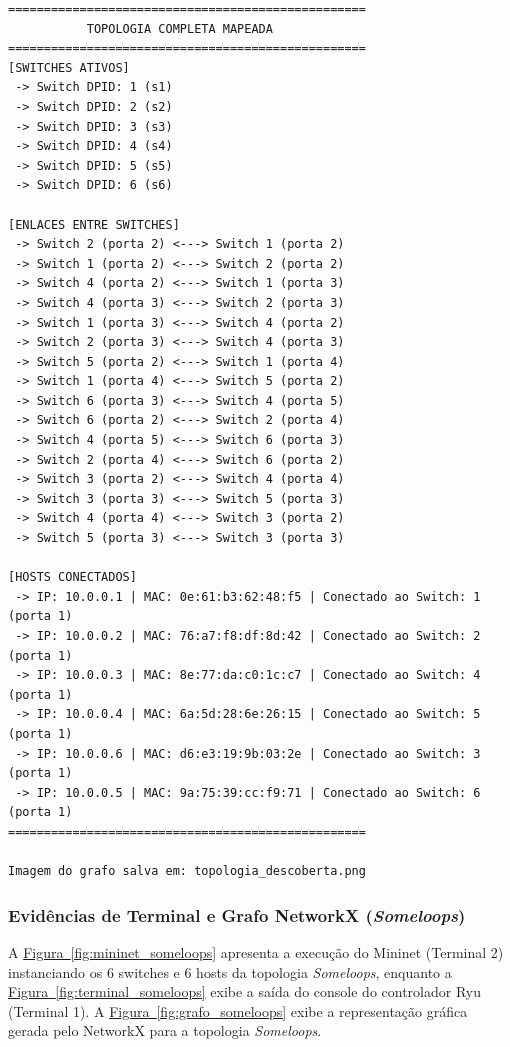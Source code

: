 \documentclass[12pt,a4paper]{article}
\begin{document}
\begin{lstlisting}[caption={Saida consolidada do controlador Ryu para a topologia Someloops}]
==================================================
           TOPOLOGIA COMPLETA MAPEADA            
==================================================
[SWITCHES ATIVOS]
 -> Switch DPID: 1 (s1)
 -> Switch DPID: 2 (s2)
 -> Switch DPID: 3 (s3)
 -> Switch DPID: 4 (s4)
 -> Switch DPID: 5 (s5)
 -> Switch DPID: 6 (s6)

[ENLACES ENTRE SWITCHES]
 -> Switch 2 (porta 2) <---> Switch 1 (porta 2)
 -> Switch 1 (porta 2) <---> Switch 2 (porta 2)
 -> Switch 4 (porta 2) <---> Switch 1 (porta 3)
 -> Switch 4 (porta 3) <---> Switch 2 (porta 3)
 -> Switch 1 (porta 3) <---> Switch 4 (porta 2)
 -> Switch 2 (porta 3) <---> Switch 4 (porta 3)
 -> Switch 5 (porta 2) <---> Switch 1 (porta 4)
 -> Switch 1 (porta 4) <---> Switch 5 (porta 2)
 -> Switch 6 (porta 3) <---> Switch 4 (porta 5)
 -> Switch 6 (porta 2) <---> Switch 2 (porta 4)
 -> Switch 4 (porta 5) <---> Switch 6 (porta 3)
 -> Switch 2 (porta 4) <---> Switch 6 (porta 2)
 -> Switch 3 (porta 2) <---> Switch 4 (porta 4)
 -> Switch 3 (porta 3) <---> Switch 5 (porta 3)
 -> Switch 4 (porta 4) <---> Switch 3 (porta 2)
 -> Switch 5 (porta 3) <---> Switch 3 (porta 3)

[HOSTS CONECTADOS]
 -> IP: 10.0.0.1 | MAC: 0e:61:b3:62:48:f5 | Conectado ao Switch: 1 (porta 1)
 -> IP: 10.0.0.2 | MAC: 76:a7:f8:df:8d:42 | Conectado ao Switch: 2 (porta 1)
 -> IP: 10.0.0.3 | MAC: 8e:77:da:c0:1c:c7 | Conectado ao Switch: 4 (porta 1)
 -> IP: 10.0.0.4 | MAC: 6a:5d:28:6e:26:15 | Conectado ao Switch: 5 (porta 1)
 -> IP: 10.0.0.6 | MAC: d6:e3:19:9b:03:2e | Conectado ao Switch: 3 (porta 1)
 -> IP: 10.0.0.5 | MAC: 9a:75:39:cc:f9:71 | Conectado ao Switch: 6 (porta 1)
==================================================

Imagem do grafo salva em: topologia_descoberta.png
\end{lstlisting}

\subsubsection{Evidências de Terminal e Grafo NetworkX (\textit{Someloops})}

A \hyperref[fig:mininet_someloops]{Figura~\ref*{fig:mininet_someloops}} apresenta a execução do Mininet (Terminal 2) instanciando os 6 switches e 6 hosts da topologia \textit{Someloops}, enquanto a \hyperref[fig:terminal_someloops]{Figura~\ref*{fig:terminal_someloops}} exibe a saída do console do controlador Ryu (Terminal 1). A \hyperref[fig:grafo_someloops]{Figura~\ref*{fig:grafo_someloops}} exibe a representação gráfica gerada pelo NetworkX para a topologia \textit{Someloops}.
\end{document}

